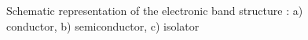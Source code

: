 \begin{figure}[h]
\centering

\caption{Schematic representation of the electronic band structure \citep{marucco2006-1}: 
a) conductor, b) semiconductor, c) isolator}
\label{fig_band_model}
\end{figure}